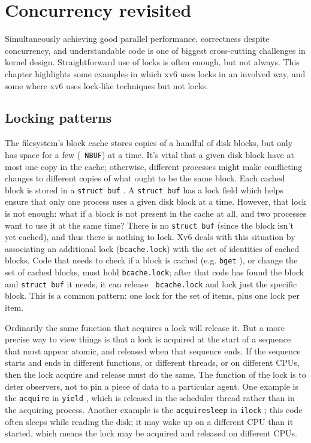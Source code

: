 \chapter{Concurrency revisited}
\label{CH:LOCK2}

Simultaneously achieving good parallel
performance, correctness despite concurrency, and understandable code
is one of biggest cross-cutting challenges in kernel design.
Straightforward use of locks is often enough, but not always. This
chapter highlights some examples in which xv6 uses locks in an
involved way, and some where xv6 uses lock-like techniques but not
locks.

\section{Locking patterns}

The filesystem's block cache  stores
copies of a handful of disk blocks, but only has space for a few ({\tt
  NBUF}) at a time. It's vital that a given disk block have at most
one copy in the cache; otherwise, different processes might make
conflicting changes to different copies of what ought to be the same
block. Each cached block is stored in a {\tt struct buf}
. A {\tt struct buf} has a lock field which
helps ensure that only one process uses a given disk block at a time.
However, that lock is not enough: what if a block is not present in
the cache at all, and two processes want to use it at the same time?
There is no {\tt struct buf} (since the block isn't yet cached), and
thus there is nothing to lock. Xv6 deals with this situation by
associating an additional lock ({\tt bcache.lock}) with the set of
identities of cached blocks. Code that needs to check if a block is
cached (e.g. {\tt bget} ), or change the
set of cached blocks, must hold {\tt bcache.lock}; after that code has
found the block and {\tt struct buf} it needs, it can release {\tt
  bcache.lock} and lock just the specific block. This is a common
pattern: one lock for the set of items, plus one lock per item.

Ordinarily the same function that acquires a lock will release it. But
a more precise way to view things is that a lock is acquired at the
start of a sequence that must appear atomic, and released when that
sequence ends. If the sequence starts and ends in different functions,
or different threads, or on different CPUs, then the lock acquire and
release must do the same. The function of the lock is to deter
observers, not to pin a piece of data to a particular agent. One
example is the {\tt acquire} in {\tt yield}
, which is released in the scheduler
thread rather than in the acquiring process. Another example is the
{\tt acquiresleep} in {\tt ilock} ; this
code often sleeps while reading the disk; it may wake up on a
different CPU than it started, which means the lock may be acquired
and released on different CPUs.

